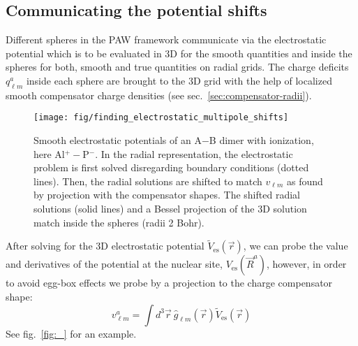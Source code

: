 \documentclass[oribibl]{llncs}
\newcommand{\um}[1]{_{\mathrm{#1}}}
\begin{document}
\subsection{Communicating the potential shifts}\label{sec:multipole-shifts}
Different spheres in the PAW framework communicate via the electrostatic
potential which is to be evaluated in 3D for the smooth quantities
and inside the spheres for both, smooth and true quantities on radial grids.
The charge deficits $q^a_{\ell m}$ inside each sphere are
brought to the 3D grid with the help of localized smooth compensator charge densities 
(see sec.~\ref{sec:compensator-radii}).
%
\begin{figure}
  \begin{minipage}[c]{.990\textwidth}
	\texttt{[image: fig/finding\_electrostatic\_multipole\_shifts]} %
  \end{minipage}\hfill
  \begin{minipage}[c]{.009\textwidth}
  \end{minipage}
  \label{fig:multipole-shifts}
  \caption{Smooth electrostatic potentials of an A$-$B dimer with ionization, here Al$^+ -$P$^-$.
  In the radial representation, the electrostatic problem is first solved disregarding boundary conditions (dotted lines).
  Then, the radial solutions are shifted to match $v_{\ell m}$ as found by projection with the compensator shapes.
  The shifted radial solutions (solid lines) and a Bessel projection of the 3D solution match inside the spheres (radii 2 Bohr).}
\end{figure}
%
%
After solving for the 3D electrostatic potential $\tilde V\um{es}(\vec r)$,
we can probe the value and derivatives of the potential at the nuclear site, $V\um{es}(\vec R^a)$,
however, in order to avoid egg-box effects we
probe by a projection to the charge compensator shape:
$$ v^a_{\ell m} = \int d^3 \vec r \  \hat g_{\ell m}(\vec r) \tilde V\um{es}(\vec r) $$
See fig.~\ref{fig:_} for an example.
\end{document}
